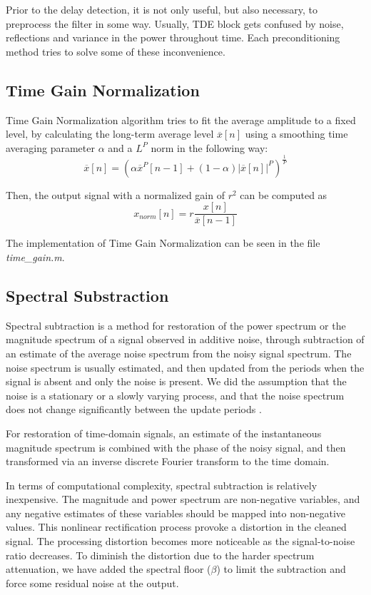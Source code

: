 Prior to the delay detection, it is not only useful, but also necessary, to preprocess the filter in some way. Usually, TDE block gets confused by noise, reflections and variance in the power throughout time. Each preconditioning method tries to solve some of these inconvenience.
\subsection{Time Gain Normalization}
  Time Gain Normalization algorithm tries to fit the average amplitude to a fixed level, by calculating the long-term average level $\overline{x}[n]$ using a smoothing time averaging parameter $\alpha$ and a $L^P$ norm in the following way:
  \begin{dmath}
    \overline{x}[n] = (\alpha \overline{x}^P[n-1] + (1-\alpha) |\overline{x}[n]|^P ) ^{\frac{1}{P}}
  \end{dmath}
  
  Then, the output signal with a normalized gain of $r^2$ can be computed as
  \begin{dmath}
    x_{norm}[n] = r \frac{x[n]}{\overline{x}[n-1]}
  \end{dmath}
  
  The implementation of Time Gain Normalization can be seen in the file \emph{time\_gain.m}\cite{timegain.m}.
  
\subsection{Spectral Substraction}
  Spectral subtraction is a method for restoration of the power spectrum or the magnitude spectrum of a signal observed in additive noise, through subtraction of an estimate of the average noise spectrum from the noisy signal spectrum. The noise spectrum is usually estimated, and then updated from the periods when the signal is absent and only the noise is present. We did the assumption that the noise is a stationary or a slowly varying process, and that the noise spectrum does not change significantly between the update periods \cite{speech}. 

  For restoration of time-domain signals, an estimate of the instantaneous magnitude spectrum is combined with the phase of the noisy signal, and then transformed via an inverse discrete Fourier transform to the time domain. 

  In terms of computational complexity, spectral subtraction is relatively inexpensive. The magnitude and power spectrum are non-negative variables, and any negative estimates of these variables should be mapped into non-negative values. This nonlinear rectification process provoke a distortion in the cleaned signal. The processing distortion becomes more noticeable as the signal-to-noise ratio decreases. To diminish the distortion due to the harder spectrum attenuation, we have added the spectral floor ($\beta$) to limit the subtraction and force some residual noise at the output.
  
